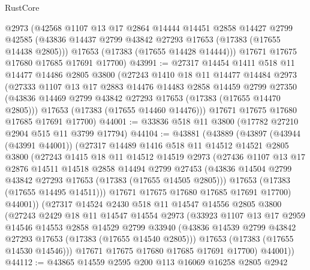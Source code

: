 \begin{lexlean}{RustCore}
\begin{coremodule}
      @2973
      (@42568
        @1107
        @13
        @17
        @2864
        @14444
        @14451
        @2858
        @14427
        @2799
        @42585
        (@43836 @14437 @2799 @43842 @27293 @17653 (@17383 (@17655 @14438 @2805)))
        @17653
        (@17383 (@17655 @14428 @14444)))
      @17671
      @17675
      @17680
      @17685
      @17691
      @17700)
@43991 := @27317
    @14454
    @1411
    @518
    @11
    @14477
    @14486
    @2805
    @3800
    (@27243
      @1410
      @18
      @11
      @14477
      @14484
      @2973
      (@27333
        @1107
        @13
        @17
        @2883
        @14476
        @14483
        @2858
        @14459
        @2799
        @27350
        (@43836 @14469 @2799 @43842 @27293 @17653 (@17383 (@17655 @14470 @2805)))
        @17653
        (@17383 (@17655 @14460 @14476)))
      @17671
      @17675
      @17680
      @17685
      @17691
      @17700)
@44001 := @33836 @518 @11 @3800 (@17782 @27210 @2904 @515 @11 @3799 @17794)
@44104 := @43881
    (@43889
      (@43897
        (@43944 (@43991 @44001))
        (@27317
          @14489
          @1416
          @518
          @11
          @14512
          @14521
          @2805
          @3800
          (@27243
            @1415
            @18
            @11
            @14512
            @14519
            @2973
            (@27436
              @1107
              @13
              @17
              @2876
              @14511
              @14518
              @2858
              @14494
              @2799
              @27453
              (@43836 @14504 @2799 @43842 @27293 @17653 (@17383 (@17655 @14505 @2805)))
              @17653
              (@17383 (@17655 @14495 @14511)))
            @17671
            @17675
            @17680
            @17685
            @17691
            @17700)
          @44001))
      (@27317
        @14524
        @2430
        @518
        @11
        @14547
        @14556
        @2805
        @3800
        (@27243
          @2429
          @18
          @11
          @14547
          @14554
          @2973
          (@33923
            @1107
            @13
            @17
            @2959
            @14546
            @14553
            @2858
            @14529
            @2799
            @33940
            (@43836 @14539 @2799 @43842 @27293 @17653 (@17383 (@17655 @14540 @2805)))
            @17653
            (@17383 (@17655 @14530 @14546)))
          @17671
          @17675
          @17680
          @17685
          @17691
          @17700)
        @44001))
@44112 := @43865 @14559 @2595 @200 @113 @16069 @16258 @2805 @2942

\end{coremodule}
\end{lexlean}
